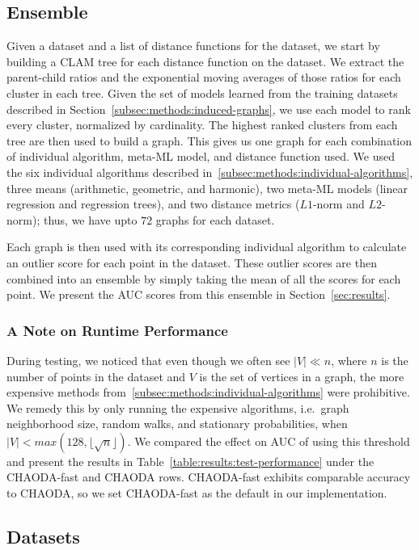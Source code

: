 \subsection{Ensemble}
\label{subsec:methods:ensemble}

Given a dataset and a list of distance functions for the dataset, we start by building a CLAM tree for each distance function on the dataset.
We extract the parent-child ratios and the exponential moving averages of those ratios for each cluster in each tree.
Given the set of models learned from the training datasets described in Section~\ref{subsec:methods:induced-graphs}, we use each model to rank every cluster, normalized by cardinality.
The highest ranked clusters from each tree are then used to build a graph.
This gives us one graph for each combination of individual algorithm, meta-ML model, and distance function used.
We used the six individual algorithms described in~\ref{subsec:methods:individual-algorithms}, three means (arithmetic, geometric, and harmonic), two meta-ML models (linear regression and regression trees), and two distance metrics ($L1$-norm and $L2$-norm);
thus, we have upto $72$ graphs for each dataset.

Each graph is then used with its corresponding individual algorithm to calculate an outlier score for each point in the dataset.
These outlier scores are then combined into an ensemble by simply taking the mean of all the scores for each point.
We present the AUC scores from this ensemble in Section~\ref{sec:results}.

\subsubsection{A Note on Runtime Performance}

During testing, we noticed that even though we often see $|V| \ll n $, where $n$ is the number of points in the dataset and $V$ is the set of vertices in a graph, the more expensive methods from~\ref{subsec:methods:individual-algorithms} were prohibitive.
We remedy this by only running the expensive algorithms, i.e.\ graph neighborhood size, random walks, and stationary probabilities, when $|V| < max(128, \lfloor \sqrt n \rfloor)$.
We compared the effect on AUC of using this threshold and present the results in Table~\ref{table:results:test-performance} under the CHAODA-fast and CHAODA rows.
CHAODA-fast exhibits comparable accuracy to CHAODA, so we
set CHAODA-fast as the default in our implementation.


\subsection{Datasets}
\label{subsec:methods:datasets}


